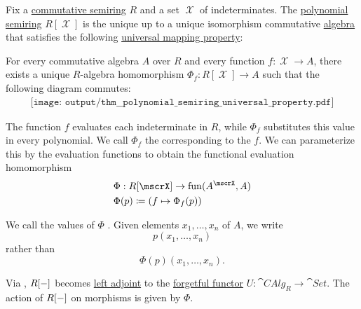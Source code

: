 \begin{proposition}\label{thm:polynomial_semiring_universal_property}
  Fix a \hyperref[def:semiring/commutative]{commutative semiring} \( R \) and a set \( \mscrX \) of indeterminates. The \hyperref[def:polynomial_semiring]{polynomial semiring} \( R[\mscrX] \) is the unique up to a unique isomorphism commutative \hyperref[def:algebra_over_semiring]{algebra} that satisfies the following \hyperref[rem:universal_mapping_property]{universal mapping property}:
  \begin{displayquote}
    For every commutative algebra \( A \) over \( R \) and every function \( f: \mscrX \to A \), there exists a unique \( R \)-algebra homomorphism \( \Phi_f: R[\mscrX] \to A \) such that the following diagram commutes:
    \begin{equation}\label{eq:thm:free_semimodule_universal_property/diagram}
      \begin{aligned}
        \texttt{[image: output/thm\_\_polynomial\_semiring\_universal\_property.pdf]}
      \end{aligned}
    \end{equation}
  \end{displayquote}

  The function \( f \) evaluates each indeterminate in \( R \), while \( \Phi_f \) substitutes this value in every polynomial. We call \( \Phi_f \) the  corresponding to the  \( f \). We can parameterize this by the evaluation functions to obtain the functional evaluation homomorphism
  \begin{equation*}
    \begin{aligned}
      &\Phi: R[\mscrX] \to \fun(A^\mscrX, A) \\
      &\Phi(p) \coloneqq (f \mapsto \Phi_f(p))
    \end{aligned}
  \end{equation*}

  We call the values of \( \Phi \) . Given elements \( x_1, \ldots, x_n \) of \( A \), we write
  \begin{equation*}
    p(x_1, \ldots, x_n)
  \end{equation*}
  rather than
  \begin{equation*}
    \Phi(p)(x_1, \ldots, x_n).
  \end{equation*}

  Via , \( R[\anon*] \) becomes \hyperref[def:category_adjunction]{left adjoint} to the \hyperref[def:concrete_category]{forgetful functor} \( U: \cat{CAlg}_R \to \cat{Set} \). The action of \( R[\anon*] \) on morphisms is given by \( \Phi \).
\end{proposition}
